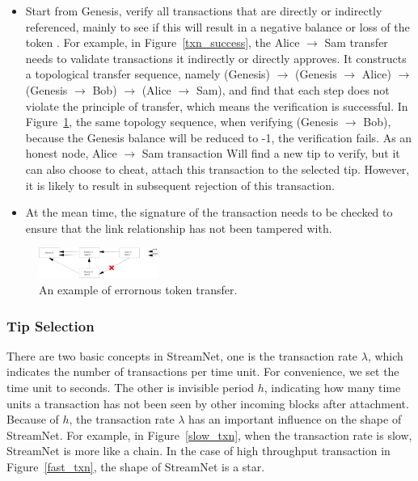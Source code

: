\begin{itemize}
\item Start from Genesis, verify all transactions that are directly or indirectly referenced, 
mainly to see if this will result in a negative balance or loss of the token \cite{gal_2018}.
For example, in Figure~\ref{txn_success}, the Alice $\rightarrow$ Sam transfer needs to validate transactions it indirectly or directly approves.
It constructs a topological transfer sequence, 
namely (Genesis) $\rightarrow$ (Genesis $\rightarrow$ Alice) $\rightarrow$ (Genesis $\rightarrow$ Bob) $\rightarrow$ (Alice $\rightarrow$ Sam),
and find that each step does not violate the principle of transfer, which means the verification is successful.
In Figure~\ref{txn_fail}, the same topology sequence, when verifying (Genesis $\rightarrow$ Bob), 
because the Genesis balance will be reduced to -1, the verification fails.
As an honest node, Alice $\rightarrow$ Sam transaction Will find a new tip to verify,
but it can also choose to cheat, attach this transaction to the selected tip.
However, it is likely to result in subsequent rejection of this transaction.
\item At the mean time, the signature of the transaction needs to be checked to ensure that the link relationship has not been tampered with.
\end{itemize}

\begin{figure}[!ht]
\begin{center}
\includegraphics[width=0.35\textwidth]{figures/txn_fail.eps}
    \caption{
        An example of errornous token transfer.
     }
\label{txn_fail}
\end{center}
\end{figure}

\subsubsection{Tip Selection}
There are two basic concepts in StreamNet, one is the transaction rate $\lambda$, which indicates the number of transactions per time unit.
For convenience, we set the time unit to seconds.
The other is invisible period $h$, indicating how many time units a transaction has not been seen by other incoming blocks after attachment.
Because of $h$, the transaction rate $\lambda$ has an important influence on the shape of StreamNet.
For example, in Figure~\ref{slow_txn}, when the transaction rate is slow, StreamNet is more like a chain.
In the case of high throughput transaction in Figure~\ref{fast_txn}, the shape of StreamNet is a star.

